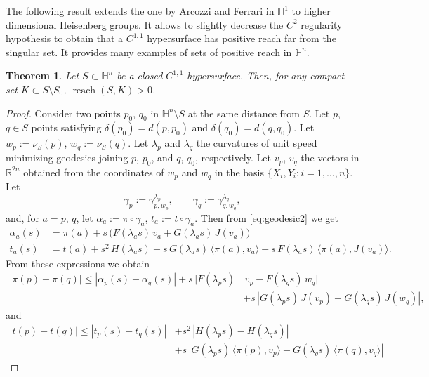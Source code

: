 \documentclass[10pt]{amsart}
\newtheorem{theorem}{Theorem}[section]
\theoremstyle{definition}
\theoremstyle{remark}
\numberwithin{equation}{section}
\begin{document}
The following result extends the one by Arcozzi and Ferrari in ${{\mathbb{H}}}^1$ \cite{MR2299576} to higher dimensional Heisenberg groups. It allows to slightly decrease the $C^2$ regularity hypothesis to obtain that a $C^{1,1}$ hypersurface has positive reach far from the singular set.  It provides many examples of sets of positive reach in ${{\mathbb{H}}}^n$.

\begin{theorem}
\label{thm:reachc11}
Let $S\subset{{\mathbb{H}}}^n$ be a closed $C^{1,1}$ hypersurface. Then, for any compact set $K\subset S\setminus S_{0}$, $\operatorname{reach}(S,K)>0$.
\end{theorem}

\begin{proof}

Consider two points $p_{0}$, $q_{0}$ in ${{\mathbb{H}}}^n\setminus S$ at the same distance from $S$.  Let $p$, $q\in S$ points satisfying $\delta(p_0)=d(p,p_0)$ and $\delta(q_0)=d(q,q_0)$. Let $w_{p}:=\nu_{S}(p)$, $w_{q}:=\nu_{S}(q)$.  Let ${\lambda}_{p}$ and ${\lambda}_{q}$ the curvatures of unit speed minimizing geodesics joining $p$, $p_0$, and $q$, $q_0$, respectively.  Let $v_{p}$, $v_{q}$ the vectors in
${{\mathbb{R}}}^{2n}$ obtained from the coordinates of $w_{p}$ and $w_{q}$ in the basis $\{X_{i}, Y_{i} : i=1,\ldots, n\}$.   Let
\[{\gamma}_{p}:={\gamma}_{{p},w_{p}}^{{\lambda}_{p}}, \qquad
{\gamma}_{q}:={\gamma}_{{q},w_{q}}^{{\lambda}_{q}},
\]
and, for $a=p$, $q$, let $\alpha_{a}:=\pi\circ{\gamma}_{a}$, $t_{a}:=t\circ{\gamma}_{a}$. Then from \eqref{eq:geodesic2} we get
\begin{align*}
\alpha_{a}(s)&=\pi(a)+s\,\big(F({\lambda}_{a}s)\,v_{a}+G({\lambda}_{a}s)\,J(v_{a})\big) 
\\
t_{a}(s)&=t(a)+s^2\,H({\lambda}_{a}s)+s\,G({\lambda}_{a}s)\,{\langle{\pi(a),v_{a}}\rangle}+
s\,F({\lambda}_{a}s)\,{\langle{\pi(a),J(v_{a})}\rangle}.
\end{align*}
From these expressions we obtain
\begin{align*}
|\pi(p)-\pi(q)|{\leqslant}
|\alpha_{p}(s)-\alpha_{q}(s)|+s\,|F({\lambda}_{p}s)&\,v_{p}-F({\lambda}_{q}s)\,w_{q}|
\\
&+s\,|G({\lambda}_{p}s)\,J(v_{p})-G({\lambda}_{q}s)\,J(w_{q})|,
\end{align*}
and
\begin{align*}
|t(p)-t(q)|{\leqslant} |t_{p}(s)-t_{q}(s)|&+s^2\,|H({\lambda}_{p}s)-H({\lambda}_{q}s)|
\\
&+s\,|G({\lambda}_{p}s)\,{\langle{\pi(p),v_{p}}\rangle}-G({\lambda}_{q}s)\,{\langle{\pi(q),v_{q}}\rangle}|

\end{align*}
\end{proof}
\end{document}
